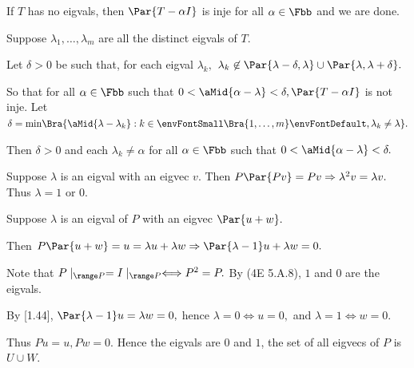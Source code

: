 \par\quad
If $T$ has no eigvals, then $\Par{T-\alpha I}$ is inje for all $\alpha\in\Fbb$ and we are done.\par\quad
Suppose $\lambda_1,\dots,\lambda_m$ are all the distinct eigvals of $T.$\par\quad
Let $\delta>0$ be such that, for each eigval $\lambda_k,$ $\lambda_k\not\in\Par{\lambda-\delta,\lambda}\cup \Par{\lambda,\lambda+\delta}.$\par\quad
So that for all $\alpha\in\Fbb$ such that $0<\aMid{\alpha-\lambda}<\delta,\Par{T-\alpha I}$ is not inje.\PfEnd\vspace{4pt}\quad
\Or Let $\delta=\min\!\Bra{\aMid{\lambda-\lambda_k}:k\in\envFontSmall\Bra{1,\dots,m}\envFontDefault,\lambda_k\neq\lambda}.$\par\quad
Then $\delta>0$ and each $\lambda_k\neq\alpha$  for all $\alpha\in\Fbb$ such that $0<\aMid{\alpha-\lambda}<\delta.$\PfEnd
\SepLine

Suppose $\lambda$ is an eigval with an eigvec $v.$ Then $P\Par{Pv}=Pv\Rightarrow\lambda^2 v=\lambda v.$ Thus $\lambda=1$ or $0.$\PfEnd
\SepLine

\par\quad
Suppose $\lambda$ is an eigval of $P$ with an eigvec $\Par{u+w}.$\par\quad
Then $P\Par{u+w}=u=\lambda u+\lambda w\Rightarrow\Par{\lambda-1}u+\lambda w=0.$\par\quad
\Or Note that $P\mid_{\range P}=I\mid_{\range P}\Longleftrightarrow P^2=P.$ By (4E 5.A.8), $1$ and $0$ are the eigvals.\par\quad
By [1.44], $\Par{\lambda-1}u=\lambda w=0,$ hence $\lambda=0\Longleftrightarrow u=0,$ and $\lambda=1\Longleftrightarrow w=0.$\par\quad
Thus $Pu=u,Pw=0.$ Hence the eigvals are $0$ and $1$, the set of all eigvecs of $P$ is $U\cup W.$\PfEnd
\SepLine\pagebreak

